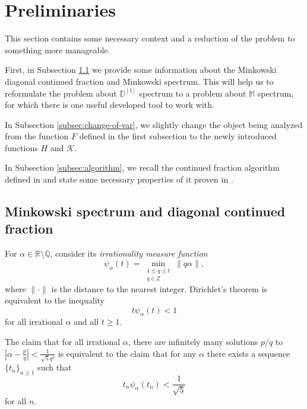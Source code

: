 \documentclass[11pt]{amsart}
\newcommand{\R}{\mathbb R}
\newcommand{\Q}{\mathbb Q}
\newcommand{\MS}{\mathbb M}
\newcommand{\Kfun}{\mathcal K}
\begin{document}
\section{Preliminaries}
This section contains some necessary context and a reduction of the problem to something more manageable. 

First, in Subsection \ref{subsec:minkspec} we provide some information about the Minkowski diagonal continued fraction and Minkowski spectrum. This will help us to reformulate the problem about $\mathbb{D}^{[1]}$ spectrum to a problem about $\MS$ spectrum, for which there is one useful developed tool to work with. 

In Subsection \ref{subsec:change-of-var}, we slightly change the object being analyzed from the function $F$ defined in the first subsection to the newly introduced functions $H$ and $\Kfun$.

In Subsection \ref{subsec:algorithm}, we recall the continued fraction algorithm defined in \cite{ShulgaCusick} and state some necessary properties of it proven in \cite{gayfulin2025realnumbersumreal, ShulgaCusick}.

\subsection{Minkowski spectrum and diagonal continued fraction}\label{subsec:minkspec} 
For $\alpha\in\R\setminus\Q$, consider its {\it irrationality measure function} 
$$
\psi_\alpha(t) = \min_{\substack {1\leq q \leq t \\ q\in\mathbb{Z}}} \| q\alpha\|,
$$
where $\|\cdot\|$ is the distance to the nearest integer. Dirichlet's theorem is equivalent to the inequality \begin{equation}\label{eq:dirichlet}
t\psi_\alpha(t)< 1
\end{equation}for all irrational $\alpha$ and all $t\geq1$.

The claim that for all irrational $\alpha$, there are infinitely many solutions $p/q$ to $\left| \alpha - \frac{p}{q}\right|< \frac{1}{\sqrt5q^2}$ is equivalent to the claim that for any $\alpha$ there exists a sequence $\{t_n\}_{n\geq1}$ such that 
\begin{equation}\label{eq:corollary:dirichlet}
    t_n\psi_\alpha(t_n)<\frac{1}{\sqrt5}
    \end{equation}
for all $n$.
\end{document}
